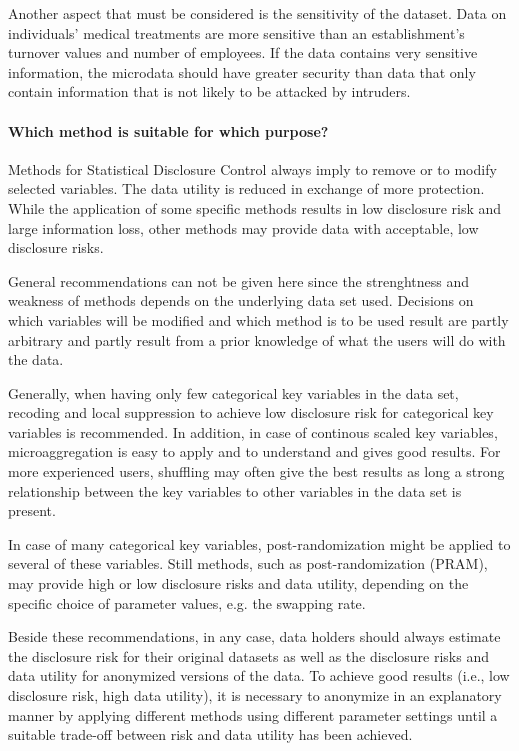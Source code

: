 \documentclass[12pt]{scrartcl}\usepackage[]{graphicx}\usepackage[]{color}
\begin{document}
Another aspect that must be considered is the sensitivity of the dataset. Data on individuals' medical treatments are more sensitive than an establishment's turnover values and number of employees. If the data contains very sensitive information, the microdata should have greater security than data that only contain information that is not likely to be attacked by intruders.

\paragraph{Which method is suitable for which purpose?}
Methods for Statistical Disclosure Control  always imply to remove or to modify selected variables. The data utility is reduced in exchange of more protection. While the application of some specific methods results in low disclosure risk and large information loss, other methods may provide data with acceptable, low disclosure risks.

General recommendations can not be given here since the strenghtness and weakness of methods depends on the underlying data set used. Decisions on which variables will be modified and which method is to be used result are partly arbitrary and partly result from a prior knowledge of what the users will do with the data.

Generally, when having only few categorical key variables in the data set, recoding and local suppression to achieve low disclosure risk for categorical key variables is recommended. In addition, in case of continous scaled key variables, microaggregation is easy to apply and to understand and gives good results. For more experienced users, shuffling may often give the best results as long a strong relationship between the key variables to other variables in the data set is present.

In case of many categorical key variables, post-randomization might be applied to several of these variables. Still methods, such as post-randomization (PRAM), may provide high or low disclosure risks and data utility, depending on the specific choice of parameter values, e.g. the swapping rate.

Beside these recommendations, in any case, data holders should always estimate the disclosure risk for their original datasets as well as the disclosure risks and data utility for anonymized versions of the data. To achieve good results (i.e., low disclosure risk, high data utility), it is necessary to anonymize in an explanatory manner by applying different methods using different parameter settings until a suitable trade-off between risk and data utility has been achieved.
\end{document}
